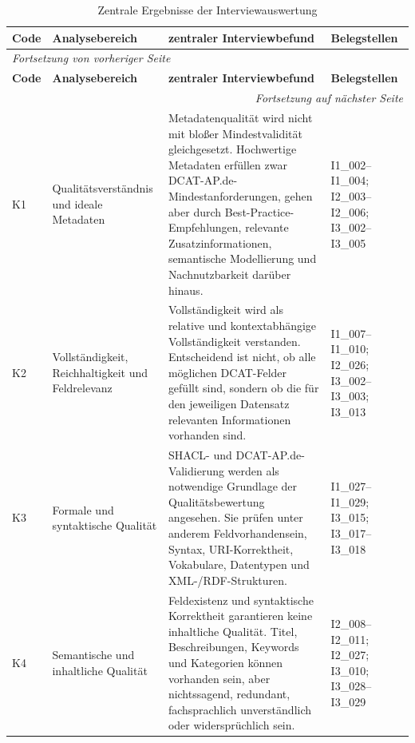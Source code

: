 \begin{center}
\scriptsize
\setlength{\tabcolsep}{4pt}
\renewcommand{\arraystretch}{0.9}
\begin{longtable}{p{} p{} p{} p{}}
\caption{Zentrale Ergebnisse der Interviewauswertung}
\label{tab:zentrale_interviewergebnisse}\\
\toprule
\textbf{Code} & \textbf{Analysebereich} & \textbf{zentraler Interviewbefund} & \textbf{Belegstellen} \\
\midrule
\endfirsthead

\multicolumn{4}{l}{\textit{Fortsetzung von vorheriger Seite}} \\
\toprule
\textbf{Code} & \textbf{Analysebereich} & \textbf{zentraler Interviewbefund} & \textbf{Belegstellen} \\
\midrule
\endhead

\midrule
\multicolumn{4}{r}{\textit{Fortsetzung auf nächster Seite}} \\
\endfoot

\bottomrule
\endlastfoot

K1 & Qualitätsverständnis und ideale Metadaten
& Metadatenqualität wird nicht mit bloßer Mindestvalidität gleichgesetzt. Hochwertige Metadaten erfüllen zwar DCAT-AP.de-Mindestanforderungen, gehen aber durch Best-Practice-Empfehlungen, relevante Zusatzinformationen, semantische Modellierung und Nachnutzbarkeit darüber hinaus.
& I1\_002--I1\_004; I2\_003--I2\_006; I3\_002--I3\_005 \\ \hline

K2 & Vollständigkeit, Reichhaltigkeit und Feldrelevanz
& Vollständigkeit wird als relative und kontextabhängige Vollständigkeit verstanden. Entscheidend ist nicht, ob alle möglichen DCAT-Felder gefüllt sind, sondern ob die für den jeweiligen Datensatz relevanten Informationen vorhanden sind.
& I1\_007--I1\_010; I2\_026; I3\_002--I3\_003; I3\_013 \\ \hline

K3 & Formale und syntaktische Qualität
& SHACL- und DCAT-AP.de-Validierung werden als notwendige Grundlage der Qualitätsbewertung angesehen. Sie prüfen unter anderem Feldvorhandensein, Syntax, URI-Korrektheit, Vokabulare, Datentypen und XML-/RDF-Strukturen.
& I1\_027--I1\_029; I3\_015; I3\_017--I3\_018 \\ \hline

K4 & Semantische und inhaltliche Qualität
& Feldexistenz und syntaktische Korrektheit garantieren keine inhaltliche Qualität. Titel, Beschreibungen, Keywords und Kategorien können vorhanden sein, aber nichtssagend, redundant, fachsprachlich unverständlich oder widersprüchlich sein.
& I2\_008--I2\_011; I2\_027; I3\_010; I3\_028--I3\_029 \\ \hline


\end{longtable}
\end{center}

